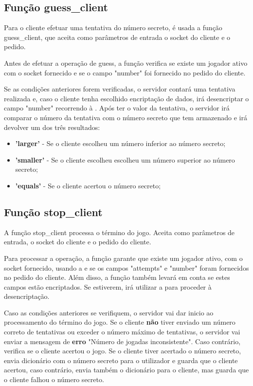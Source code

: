 \documentclass{report}
\begin{document}
\subsection{Função guess\_client}
\label{ssec:func_guess_client}

Para o cliente efetuar uma tentativa do número secreto, é usada a função guess\_client, que aceita como parâmetros de entrada o socket do cliente e o pedido.

Antes de efetuar a operação de guess, a função verifica se existe um jogador ativo com o socket fornecido e se o campo "number" foi fornecido no pedido do cliente.

Se as condições anteriores forem verificadas, o servidor contará uma tentativa realizada e, caso o cliente tenha escolhido encriptação de dados, irá desencriptar o campo "number" recorrendo à . Após ter o valor da tentativa, o servidor irá comparar o número da tentativa com o número secreto que tem armazenado e irá devolver um dos três resultados:
\begin{itemize}
\item \textbf{'larger'} - Se o cliente escolheu um número inferior ao número secreto;
\item \textbf{'smaller'} - Se o cliente escolheu escolheu um número superior ao número secreto;
\item \textbf{'equals'} - Se o cliente acertou o número secreto;
\end{itemize}

\subsection{Função stop\_client}
\label{ssec:func_stop_client}

A função stop\_client processa o término do jogo. Aceita como parâmetros de entrada, o socket do cliente e o pedido do cliente.

Para processar a operação, a função garante que existe um jogador ativo, com o socket fornecido, usando a   e se os campos "attempts" e "number" foram fornecidos no pedido do cliente. Além disso, a função também levará em conta se estes campos estão encriptados. Se estiverem, irá utilizar a  para proceder à desencriptação.

Caso as condições anteriores se verifiquem, o servidor vai dar inicio ao processamento do término do jogo. Se o cliente \textbf{não} tiver enviado um número correto de tentativas ou exceder o número máximo de tentativas, o servidor vai enviar a mensagem de \textbf{erro} "Número de jogadas inconsistente". Caso contrário, verifica se o cliente acertou o jogo. Se o cliente tiver acertado o número secreto, envia dicionário com o número secreto para o utilizador e guarda que o cliente acertou, caso contrário, envia também o dicionário para o cliente, mas guarda que o cliente falhou o número secreto.
\end{document}
